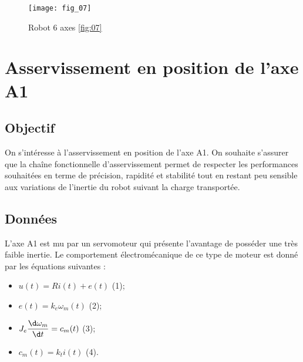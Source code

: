 {






\begin{figure}[H]
\centering
\texttt{[image: fig\_07]}
\caption{Robot 6 axes \ref{fig:07}}
\end{figure}



\section{Asservissement en position de l'axe A1}

\subsection{Objectif}
On s’intéresse à l’asservissement en position de l’axe A1. On souhaite s’assurer que la chaîne 
fonctionnelle d’asservissement permet de respecter les performances souhaitées en terme de 
précision, rapidité et stabilité tout en restant peu sensible aux variations de l’inertie du robot 
suivant la charge transportée. 

\subsection{Données} 
L’axe A1 est mu par un servomoteur qui présente l'avantage de posséder une très faible 
inertie. Le comportement électromécanique de ce type de moteur est donné par les équations 
suivantes : 
\begin{itemize}[$\bullet$]
\item $u(t) = Ri(t) + e(t)$ (1);
\item $e(t) = k_e \omega_m(t)$  (2);
\item $J_e \dfrac{\d \omega_m}{\d t} = c_m(t)$ (3);
\item $c_m(t) = k_t i(t)$ (4).
\end{itemize}

}
